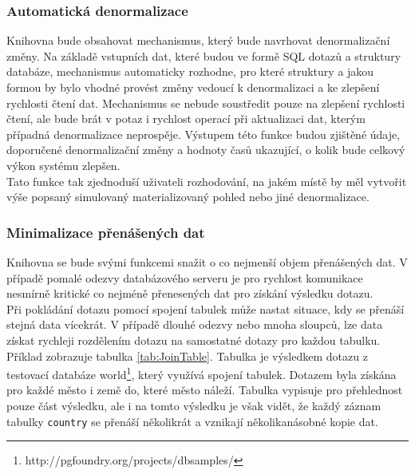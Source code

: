 \documentclass[ing,male,java,dept456]{diploma}						%
\begin{document}
\subsubsection{Automatická denormalizace}

Knihovna bude obsahovat mechanismus, který bude navrhovat denormalizační změny. Na základě vstupních dat, které budou ve formě SQL dotazů a struktury databáze, mechanismus automaticky rozhodne, pro které struktury a jakou formou by bylo vhodné provést změny vedoucí k denormalizaci a ke zlepšení rychlosti čtení dat. Mechanismus se nebude soustředit pouze na zlepšení rychlosti čtení, ale bude brát v potaz i rychlost operací při aktualizaci dat, kterým případná denormalizace neprospěje. Výstupem této funkce budou zjištěné údaje, doporučené denormalizační změny a hodnoty časů ukazující, o kolik bude celkový výkon systému zlepšen. \\
Tato funkce tak zjednoduší uživateli rozhodování, na jakém místě by měl vytvořit výše popsaný simulovaný materializovaný pohled nebo jiné denormalizace.

\subsubsection{Minimalizace přenášených dat}
\label{subsubsec:Selectin}

Knihovna se bude svými funkcemi snažit o co nejmenší objem přenášených dat. V případě pomalé odezvy databázového serveru je pro rychlost komunikace nesmírně kritické co nejméně přenesených dat pro získání výsledku dotazu. \\
Při pokládání dotazu pomocí spojení tabulek může nastat situace, kdy se přenáší stejná data vícekrát. V případě dlouhé odezvy nebo mnoha sloupců, lze data získat rychleji rozdělením dotazu na samostatné dotazy pro každou tabulku. Příklad zobrazuje tabulka \ref{tab:JoinTable}. Tabulka je výsledkem dotazu z testovací databáze world\footnote{http://pgfoundry.org/projects/dbsamples/}, který využívá spojení tabulek. Dotazem byla získána pro každé město i země do, které město náleží. Tabulka vypisuje pro přehlednost pouze část výsledku, ale i na tomto výsledku je však vidět, že každý záznam tabulky \lstinline[style=inlinepython]|country| se přenáší několikrát a vznikají několikanásobné kopie dat. \\
\end{document}
